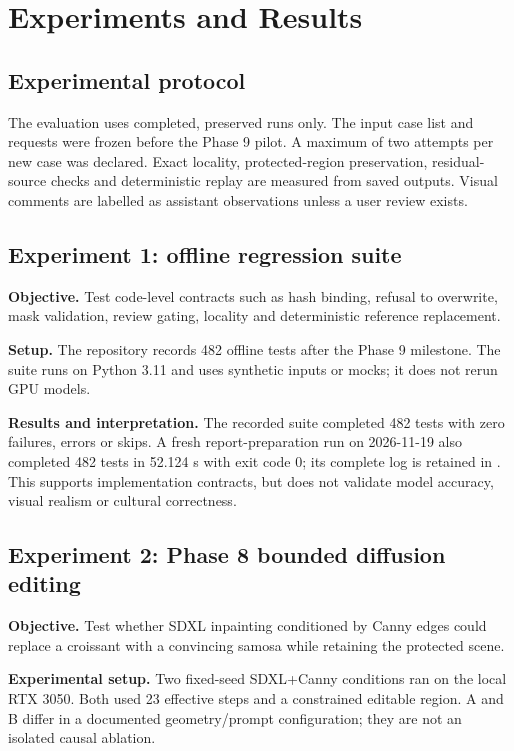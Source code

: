 \chapter{Experiments and Results}
\label{ch:results}
\section{Experimental protocol}
The evaluation uses completed, preserved runs only. The input case list and requests were frozen before the Phase 9 pilot. A maximum of two attempts per new case was declared. Exact locality, protected-region preservation, residual-source checks and deterministic replay are measured from saved outputs. Visual comments are labelled as assistant observations unless a user review exists.

\section{Experiment 1: offline regression suite}
\textbf{Objective.} Test code-level contracts such as hash binding, refusal to overwrite, mask validation, review gating, locality and deterministic reference replacement.

\textbf{Setup.} The repository records 482 offline tests after the Phase 9 milestone. The suite runs on Python 3.11 and uses synthetic inputs or mocks; it does not rerun GPU models.

\textbf{Results and interpretation.} The recorded suite completed 482 tests with zero failures, errors or skips. A fresh report-preparation run on 2026-11-19 also completed 482 tests in 52.124 s with exit code 0; its complete log is retained in . This supports implementation contracts, but does not validate model accuracy, visual realism or cultural correctness.

\section{Experiment 2: Phase 8 bounded diffusion editing}
\textbf{Objective.} Test whether SDXL inpainting conditioned by Canny edges could replace a croissant with a convincing samosa while retaining the protected scene.

\textbf{Experimental setup.} Two fixed-seed SDXL+Canny conditions ran on the local RTX 3050. Both used 23 effective steps and a constrained editable region. A and B differ in a documented geometry/prompt configuration; they are not an isolated causal ablation.

